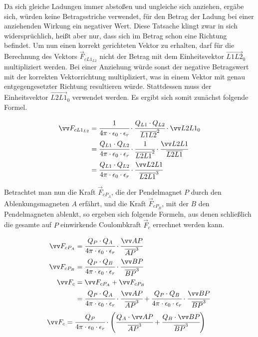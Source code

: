 Da sich gleiche Ladungen immer abstoßen und ungleiche sich anziehen, ergäbe sich, würden keine Betragsstriche verwendet, für den Betrag der Ladung bei einer anziehenden Wirkung ein negativer Wert. Diese Tatsache klingt zwar in sich widersprüchlich, heißt aber nur, dass sich im Betrag schon eine Richtung befindet. Um nun einen korrekt gerichteten Vektor zu erhalten, darf für die Berechnung des Vektors $\vec{F}_{cL1_{L2}}$ nicht der Betrag mit dem Einheitsvektor $\vec{L1L2}_{0}$ multipliziert werden. Bei einer Anziehung würde sonst der negative Betragswert mit der korrekten Vektorrichtung multipliziert, was in einem Vektor mit genau entgegengesetzter Richtung resultieren würde. Stattdessen muss der Einheitsvektor $\vec{L2L1}_{0}$ verwendet werden. Es ergibt sich somit zunächst folgende Formel.

\begin{align*}
    \vec{F}_{cL1_{L2}} &= \cfrac{1}{4\pi \cdot \epsilon_{0} \cdot \epsilon_{r}} \cdot \cfrac{Q_{L1} \cdot Q_{L2}}{\overline{L1L2}^2} \cdot \vec{L2L1}_{0} \\
                  &= \cfrac{Q_{L1} \cdot Q_{L2}}{4 \pi \cdot \epsilon_{0} \cdot \epsilon_{r}} \cdot \cfrac{1}{\overline{L2L1}^2} \cdot \cfrac{\vec{L2L1}}{\overline{L2L1}} \\
                  &= \cfrac{Q_{L1} \cdot Q_{L2}}{4 \pi \cdot \epsilon_{0} \cdot \epsilon_{r}} \cdot \cfrac{\vec{L2L1}}{\overline{L2L1}^{3}}
\end{align*}

Betrachtet man nun die Kraft $\vec{F}_{cP_A}$, die der Pendelmagnet $P$ durch den Ablenkungsmagneten $A$ erfährt, und die Kraft $\vec{F}_{cP_B}$, mit der $B$ den Pendelmagneten ablenkt, so ergeben sich folgende Formeln, aus denen schließlich die gesamte auf $P$ einwirkende Coulombkraft $\vec{F}_{c}$ errechnet werden kann.

\begin{align*}
    \vec{F}_{cP_A} &= \cfrac{Q_{P} \cdot Q_{A}}{4 \pi \cdot \epsilon_{0} \cdot \epsilon_{r}} \cdot \cfrac{\vec{AP}}{\overline{AP}^{3}} \\
    \vec{F}_{cP_B} &= \cfrac{Q_{P} \cdot Q_{B}}{4 \pi \cdot \epsilon_{0} \cdot \epsilon_{r}} \cdot \cfrac{\vec{BP}}{\overline{BP}^{3}} \\
    \vec{F}_{c} &= \vec{F}_{cP_A} + \vec{F}_{cP_B} \\
                 &= \cfrac{Q_{P} \cdot Q_{A}}{4 \pi \cdot \epsilon_{0} \cdot \epsilon_{r}} \cdot \cfrac{\vec{AP}}{\overline{AP}^{3}} + \cfrac{Q_{P} \cdot Q_{B}}{4 \pi \cdot \epsilon_{0} \cdot \epsilon_{r}} \cdot \cfrac{\vec{BP}}{\overline{BP}^{3}}
\end{align*}
\begin{align} \label{f_c}
    \vec{F}_{c} &= \cfrac{Q_{P}}{4 \pi \cdot \epsilon_{0} \cdot \epsilon_{r}} \cdot \left(\cfrac{Q_{A} \cdot \vec{AP}}{\overline{AP}^{3}} + \cfrac{Q_{B} \cdot \vec{BP}}{\overline{BP}^{3}}\right)
\end{align}

